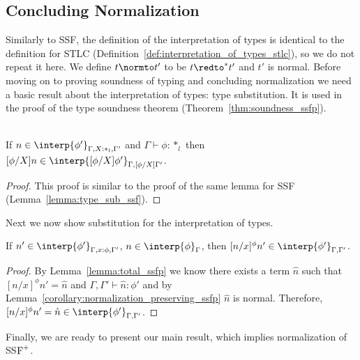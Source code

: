 \subsection{Concluding Normalization}
\label{subsec:concluding_normalization_ssfp}
Similarly to SSF, the definition of the interpretation of types is
identical to the definition for STLC
(Definition~\ref{def:interpretation_of_types_stlc}), so we do not
repeat it here.  We define $t \normto t'$ to be $t \redto^{*} t'$ and
$t'$ is normal.  Before moving on to proving soundness of typing and
concluding normalization we need a basic result about the
interpretation of types: type substitution.  It is used in the proof
of the type soundness theorem (Theorem~\ref{thm:soundness_ssfp}).

\begin{lemma}
  \ \\
  If $n \in \interp{\phi'}_{\Gamma,X:*_l,\Gamma'}$ and 
  $\Gamma \vdash \phi:*_l$ then 
  $[\phi/X]n \in \interp{[\phi/X]\phi'}_{\Gamma,[\phi/X]\Gamma'}$.
  \label{lemma:type_sub_ssfp}
\end{lemma}
\begin{proof}
  This proof is similar to the proof of the same lemma for SSF (Lemma~\ref{lemma:type_sub_ssf}).
\end{proof}
\noindent
Next we now show substitution for the interpretation of types.
\begin{lemma}
  If $n' \in \interp{\phi'}_{\Gamma,x:\phi,\Gamma'}$, $n \in \interp{\phi}_\Gamma$, then 
  $[n/x]^\phi n' \in \interp{\phi'}_{\Gamma,\Gamma'}$.
  \label{lemma:interpretation_of_types_closed_substitution_ssfp}
\end{lemma}
\begin{proof}
  By Lemma~\ref{lemma:total_ssfp} we know there exists a term $\hat{n}$ 
  such that $[n/x]^\phi n' = \hat{n}$ and $\Gamma,\Gamma' \vdash \hat{n}:\phi'$ and by 
  Lemma~\ref{corollary:normalization_preserving_ssfp} $\hat{n}$ is normal.  Therefore,
  $[n/x]^\phi n' = \hat{n} \in \interp{\phi'}_{\Gamma,\Gamma'}$.
\end{proof}
\noindent
Finally, we are ready to present our main result, which implies
normalization of SS$\mbox{F}^{+}$.


